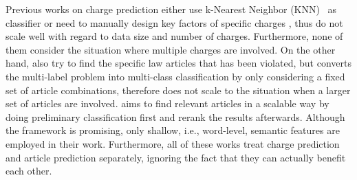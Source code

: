 
Previous works on charge prediction either use k-Nearest Neighbor (KNN)~\cite{LIU2004case,liu2006exploring} as classifier or need to manually design key factors of specific charges \cite{lin2012exploiting}, thus do not scale well with regard to data size and number of charges. Furthermore, none of them consider the situation where multiple charges are involved. On the other hand, \cite{liu2005classifying,liu2006exploring} also try to find the specific law articles that has been violated, but converts the multi-label problem into multi-class classification by only considering a fixed set of article combinations, therefore does not scale to the situation when a larger set of articles are involved. \cite{liu2015predicting} aims to find relevant articles in a scalable way by doing preliminary classification first and rerank the results afterwards. Although the framework is promising, only shallow, i.e., word-level, semantic features are employed in their work. Furthermore, all of these works treat charge prediction and article prediction separately, ignoring the fact that they can actually benefit each other. 




